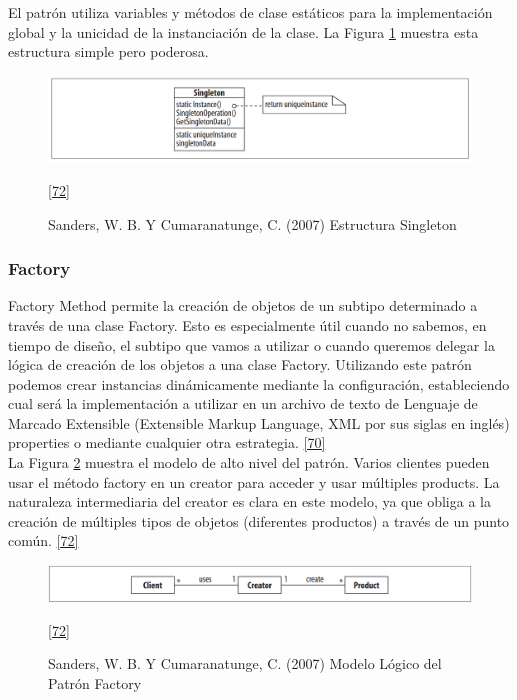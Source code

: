 El patrón utiliza variables y métodos de clase estáticos para la implementación global y la unicidad de la instanciación de la clase. La Figura \ref{fig:single} muestra esta estructura simple pero poderosa.\\

\begin{figure}[H]
	\begin{center}
		\includegraphics[width=1\textwidth]{images/marcoteorico/patrones/singleton}
		\caption{ Sanders, W. B. Y Cumaranatunge, C. (2007) Estructura Singleton}
		\hyperlink{b72}{[72]} 
		\label{fig:single}
	\end{center}
\end{figure}

\subsubsection{Factory}
Factory Method permite la creación de objetos de un subtipo determinado a través de una clase Factory. Esto es especialmente útil cuando no sabemos, en tiempo de diseño, el subtipo que vamos a utilizar o cuando queremos delegar la lógica de creación de los objetos a una clase Factory. Utilizando este patrón podemos crear instancias dinámicamente mediante la configuración, estableciendo cual será la implementación a utilizar en un archivo de texto de Lenguaje de Marcado Extensible (Extensible Markup Language, XML por sus siglas en inglés) properties o mediante cualquier otra estrategia. \hyperlink{b70}{[70]}\\

La Figura \ref{fig:factory} muestra el modelo de alto nivel del patrón. Varios clientes pueden usar el método factory en un creator para acceder y usar múltiples products. La naturaleza intermediaria del creator es clara en este modelo, ya que obliga a la creación de múltiples tipos de objetos (diferentes productos) a través de un punto común. \hyperlink{b72}{[72]} 

\begin{figure}[H]
	\begin{center}
		\includegraphics[width=1\textwidth]{images/marcoteorico/patrones/factory}
		\caption{ Sanders, W. B. Y Cumaranatunge, C. (2007) Modelo Lógico del Patrón Factory}
		\hyperlink{b72}{[72]} 
		\label{fig:factory}
	\end{center}
\end{figure}

